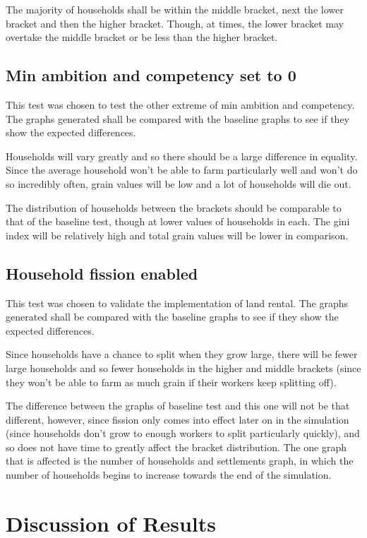 \documentclass[12pt]{article}
\begin{document}
				The majority of households shall be within the middle bracket, next the lower bracket and then the higher bracket. Though, at times, the lower bracket may overtake the middle bracket or be less than the higher bracket.
		
		
		
			\subsection{Min ambition and competency set to 0}
				This test was chosen to test the other extreme of min ambition and competency. The graphs generated shall be compared with the baseline graphs to see if they show the expected differences.
				
				Households will vary greatly and so there should be a large difference in equality. Since the average household won’t be able to farm particularly well and won’t do so incredibly often, grain values will be low and a lot of households will die out.
				
				The distribution of households between the brackets should be comparable to that of the baseline test, though at lower values of households in each. The gini index will be relatively high and total grain values will be lower in comparison.
		
			\subsection{Household fission enabled}
				This test was chosen to validate the implementation of land rental. The graphs generated shall be compared with the baseline graphs to see if they show the expected differences.
			
				Since households have a chance to split when they grow large, there will be fewer large households and so fewer households in the higher and middle brackets (since they won’t be able to farm as much grain if their workers keep splitting off). 
			
				The difference between the graphs of baseline test and this one will not be that different, however, since fission only comes into effect later on in the simulation (since households don’t grow to enough workers to split particularly quickly), and so does not have time to greatly affect the bracket distribution. The one graph that is affected is the number of households and settlements graph, in which the number of households begins to increase towards the end of the simulation.
		\section{Discussion of Results}
		
\end{document}
